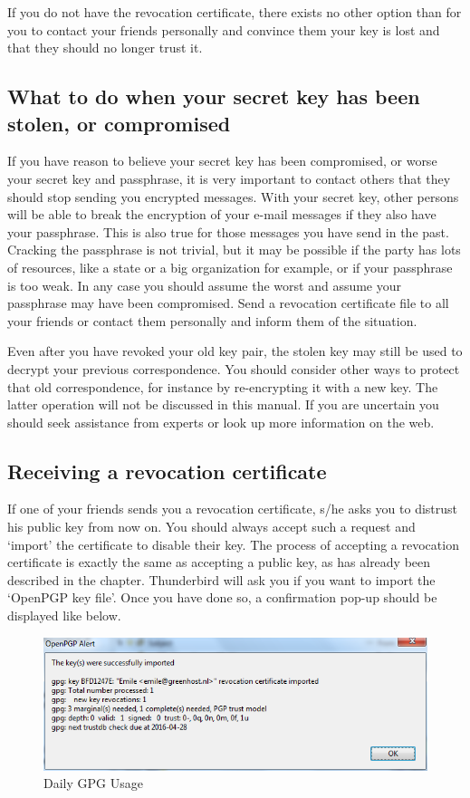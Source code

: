 If you do not have the revocation certificate, there exists no other
option than for you to contact your friends personally and convince them
your key is lost and that they should no longer trust it.

\subsection{What to do when your secret key has been stolen, or
compromised}

If you have reason to believe your secret key has been compromised, or
worse your secret key and passphrase, it is very important to contact
others that they should stop sending you encrypted messages. With your
secret key, other persons will be able to break the encryption of your
e-mail messages if they also have your passphrase. This is also true for
those messages you have send in the past. Cracking the passphrase is not
trivial, but it may be possible if the party has lots of resources, like
a state or a big organization for example, or if your passphrase is too
weak. In any case you should assume the worst and assume your passphrase
may have been compromised. Send a revocation certificate file to all
your friends or contact them personally and inform them of the
situation.

Even after you have revoked your old key pair, the stolen key may still
be used to decrypt your previous correspondence. You should consider
other ways to protect that old correspondence, for instance by
re-encrypting it with a new key. The latter operation will not be
discussed in this manual. If you are uncertain you should seek
assistance from experts or look up more information on the web.

\subsection{Receiving a revocation certificate}

If one of your friends sends you a revocation certificate, s/he asks you
to distrust his public key from now on. You should always accept such a
request and `import' the certificate to disable their key. The process
of accepting a revocation certificate is exactly the same as accepting a
public key, as has already been described in the chapter. Thunderbird
will ask you if you want to import the `OpenPGP key file'. Once you have
done so, a confirmation pop-up should be displayed like below.

\begin{figure}[htbp]
\centering
\includegraphics{daily_gpg_35.png}
\caption{Daily GPG Usage}
\end{figure}

